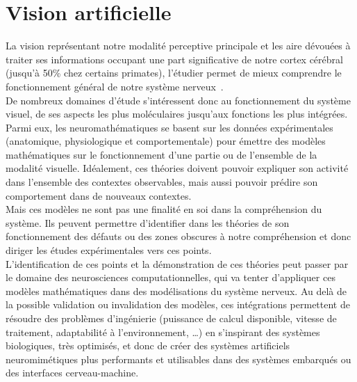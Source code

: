 
\section{Vision artificielle}
La vision représentant notre modalité perceptive principale et les aire dévouées à traiter ses informations occupant une part significative de notre cortex cérébral (jusqu'à 50\% chez certains primates), l'étudier permet de mieux comprendre le fonctionnement général de notre système nerveux~\autocite{Zhaoping2014}.\\
De nombreux domaines d'étude s'intéressent donc au fonctionnement du système visuel, de ses aspects les plus moléculaires jusqu'aux fonctions les plus intégrées. Parmi eux, les neuromathématiques se basent sur les données expérimentales (anatomique, physiologique et comportementale) pour émettre des modèles mathématiques sur le fonctionnement d'une partie ou de l'ensemble de la modalité visuelle. Idéalement, ces théories doivent pouvoir expliquer son activité dans l'ensemble des contextes observables, mais aussi pouvoir prédire son comportement dans de nouveaux contextes\autocite{Zhaoping2014}.\\
Mais ces modèles ne sont pas une finalité en soi dans la compréhension du système. Ils peuvent permettre d'identifier dans les théories de son fonctionnement des défauts ou des zones obscures à notre compréhension et donc diriger les études expérimentales vers ces points\autocite{Zhaoping2014}.\\
L'identification de ces points et la démonstration de ces théories peut passer par le domaine des neurosciences computationnelles, qui va tenter d'appliquer ces modèles mathématiques dans des modélisations du système nerveux. Au delà de la possible validation ou invalidation des modèles, ces intégrations permettent de résoudre des problèmes d'ingénierie (puissance de calcul disponible, vitesse de traitement, adaptabilité à l'environnement, \ldots) en s'inspirant des systèmes biologiques, très optimisés, et donc de créer des systèmes artificiels neuromimétiques plus performants et utilisables dans des systèmes embarqués ou des interfaces cerveau-machine.\\

